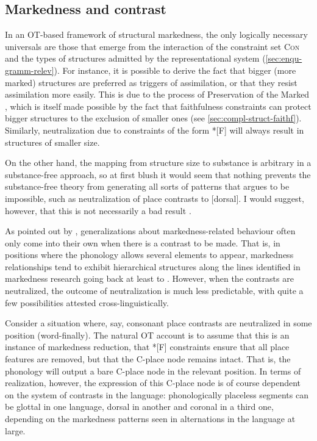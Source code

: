 \subsection{Markedness and contrast}
\label{sec:markedness-contrast}

In an OT\hyp based framework of structural markedness, the only logically necessary universals are those that emerge from the interaction of the constraint set \textsc{Con} and the types of structures admitted by the representational system (\cref{sec:enqu-gramm-relev}). For instance, it is possible to derive the fact that bigger (more marked) structures are preferred as triggers of assimilation, or that they resist assimilation more easily. This is due to the process of Preservation of the Marked \citep{rice03:_featur,delacy2006}, which is itself made possible by the fact that faithfulness constraints can protect bigger structures to the exclusion of smaller ones (see \cref{sec:compl-struct-faithf}). Similarly, neutralization due to constraints of the form *[F] will always result in structures of smaller size.

On the other hand, the mapping from structure size to substance is arbitrary in a substance\hyp free approach, so at first blush it would seem that nothing prevents the substance\hyp free theory from generating all sorts of patterns that \citet{delacy2006} argues to be impossible, such as neutralization of place contrasts to [dorsal]. I would suggest, however, that this is not necessarily a bad result \citep[\cfm][]{ramsammyng:_word_spanis}.

As pointed out by \citet{rice09:_nuanc}, generalizations about markedness\hyp related behaviour often only come into their own when there is a contrast to be made. That is, in positions where the phonology allows several elements to appear, markedness relationships tend to exhibit hierarchical structures along the lines identified in markedness research going back at least to \citet{jakobson41:_kinder_aphas_lautg}. However, when the contrasts are neutralized, the outcome of neutralization is much less predictable, with quite a few possibilities attested cross\hyp linguistically.

Consider a situation where, say, consonant place contrasts are neutralized in some position (\eg word\hyp finally). The natural OT account is to assume that this is an instance of markedness reduction, \ie that *[F] constraints ensure that all place features are removed, but that the C-place node remains intact. That is, the phonology will output a bare C-place node in the relevant position. In terms of realization, however, the expression of this C-place node is of course dependent on the system of contrasts in the language: phonologically placeless segments can be glottal in one language, dorsal in another and coronal in a third one, depending on the markedness patterns seen in alternations in the language at large.

